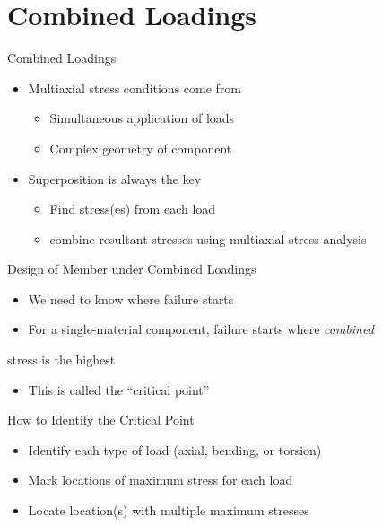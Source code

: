 \documentclass[10pt, svgnames]{beamer}
\begin{document}
\section{Combined Loadings}
\label{sec:org534be17}

\begin{frame}[label={sec:org4444e0a}]{Combined Loadings}
\begin{itemize}
\item Multiaxial stress conditions come from
\begin{itemize}
\item Simultaneous application of loads
\item Complex geometry of component
\end{itemize}
\item Superposition is always the key
\begin{itemize}
\item Find stress(es) from each load
\item combine resultant stresses using multiaxial stress analysis
\end{itemize}
\end{itemize}
\end{frame}

\begin{frame}[label={sec:org3efb1e7}]{Design of Member under Combined Loadings}
\begin{itemize}
\item We need to know where failure starts
\item For a single-material component, failure starts where \emph{combined}
\end{itemize}
stress is the highest
\begin{itemize}
\item This is called the ``critical point''
\end{itemize}
\end{frame}

\begin{frame}[label={sec:org7fe119a}]{How to Identify the Critical Point}
\begin{itemize}
\item Identify each type of load (axial, bending, or torsion)
\item Mark locations of maximum stress for each load
\item Locate location(s) with multiple maximum stresses
\end{itemize}
\end{frame}
\end{document}
